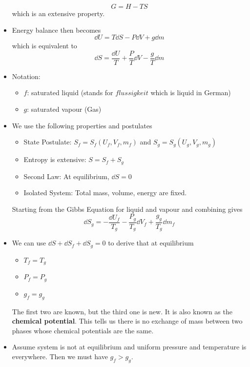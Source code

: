 \begin{itemize}
\begin{definition}
\begin{equation}
            G = H - TS
        \end{equation}
        which is an extensive property.
    \end{definition}
    \item Energy balance then becomes 
    \begin{equation}
        \dd{U} = T\dd{S} - P\dd{V} + g\dd{m}
    \end{equation}
    which is equivalent to 
    \begin{equation}
        \dd{S} = \frac{\dd{U}}{T} + \frac{P}{T}\dd{V}-\frac{g}{T}\dd{m}
    \end{equation}
    \item Notation: 
    \begin{itemize}
        \item $f$: saturated liquid (stands for $flussigkeit$ which is liquid in German)
        \item $g$: saturated vapour (Gas)
    \end{itemize}
    \item We use the following properties and postulates
    \begin{itemize}
        \item State Postulate: $S_f=S_f(U_f,V_f,m_f)$ and $S_g=S_g(U_g,V_g,m_g)$
        \item Entropy is extensive: $S=S_f+S_g$
        \item Second Law: At equilibrium, $\dd{S}=0$
        \item Isolated System: Total mass, volume, energy are fixed.
    \end{itemize}
    Starting from the Gibbs Equation for liquid and vapour and combining gives 
    \begin{equation}
        \dd{S}_g = -\frac{\dd U_f}{T_g}-\frac{P_g}{T_g}\dd{V}_f + \frac{g_g}{T_g}\dd{m}_f
    \end{equation}
    \item We can use $\dd{S}+\dd{S}_f+\dd{S}_g=0$ to derive that at equilibrium 
    \begin{itemize}
        \item $T_f=T_g$
        \item $P_f=P_g$
        \item $g_f=g_g$
    \end{itemize}
    The first two are known, but the third one is new. It is also known as the \textbf{chemical potential}. This tells us there is no exchange of mass between two phases whose chemical potentials are the same.
    \item Assume system is not at equilibrium and uniform pressure and temperature is everywhere. Then we must have $g_f>g_g.$

\end{itemize}
